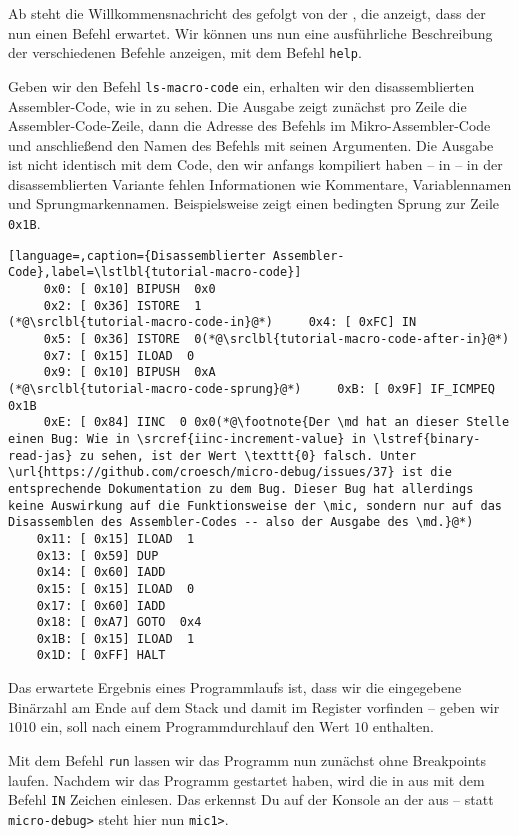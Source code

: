 Ab  steht die Willkommensnachricht des \md gefolgt von der , die anzeigt, dass der \md nun einen Befehl erwartet. Wir können uns nun eine ausführliche Beschreibung der verschiedenen Befehle anzeigen, mit dem Befehl \texttt{help}.

Geben wir den Befehl \texttt{ls-macro-code} ein, erhalten wir den disassemblierten Assembler-Code, wie in  zu sehen. Die Ausgabe zeigt zunächst pro Zeile die Assembler-Code-Zeile, dann die Adresse des Befehls im Mikro-Assembler-Code und anschließend den Namen des Befehls mit seinen Argumenten. Die Ausgabe ist nicht identisch mit dem Code, den wir anfangs kompiliert haben -- in  -- in der disassemblierten Variante fehlen Informationen wie Kommentare, Variablennamen und Sprungmarkennamen. Beispielsweise zeigt  einen bedingten Sprung zur Zeile \texttt{0x1B}.

\begin{lstlisting}[language=,caption={Disassemblierter Assembler-Code},label=\lstlbl{tutorial-macro-code}]
     0x0: [ 0x10] BIPUSH  0x0
     0x2: [ 0x36] ISTORE  1
(*@\srclbl{tutorial-macro-code-in}@*)     0x4: [ 0xFC] IN 
     0x5: [ 0x36] ISTORE  0(*@\srclbl{tutorial-macro-code-after-in}@*)
     0x7: [ 0x15] ILOAD  0
     0x9: [ 0x10] BIPUSH  0xA
(*@\srclbl{tutorial-macro-code-sprung}@*)     0xB: [ 0x9F] IF_ICMPEQ  0x1B
     0xE: [ 0x84] IINC  0 0x0(*@\footnote{Der \md hat an dieser Stelle einen Bug: Wie in \srcref{iinc-increment-value} in \lstref{binary-read-jas} zu sehen, ist der Wert \texttt{0} falsch. Unter \url{https://github.com/croesch/micro-debug/issues/37} ist die entsprechende Dokumentation zu dem Bug. Dieser Bug hat allerdings keine Auswirkung auf die Funktionsweise der \mic, sondern nur auf das Disassemblen des Assembler-Codes -- also der Ausgabe des \md.}@*)
    0x11: [ 0x15] ILOAD  1
    0x13: [ 0x59] DUP 
    0x14: [ 0x60] IADD 
    0x15: [ 0x15] ILOAD  0
    0x17: [ 0x60] IADD 
    0x18: [ 0xA7] GOTO  0x4
    0x1B: [ 0x15] ILOAD  1
    0x1D: [ 0xFF] HALT 
\end{lstlisting}

Das erwartete Ergebnis eines Programmlaufs ist, dass wir die eingegebene Binärzahl am Ende auf dem Stack und damit im Register  vorfinden -- geben wir $1010$ ein, soll  nach einem Programmdurchlauf den Wert $10$ enthalten.

Mit dem Befehl \texttt{run} lassen wir das Programm nun zunächst ohne Breakpoints laufen. Nachdem wir das Programm gestartet haben, wird die \mic in  aus  mit dem Befehl \texttt{IN} Zeichen einlesen. Das erkennst Du auf der Konsole an der  aus  -- statt \texttt{micro-debug>} steht hier nun \texttt{mic1>}.


